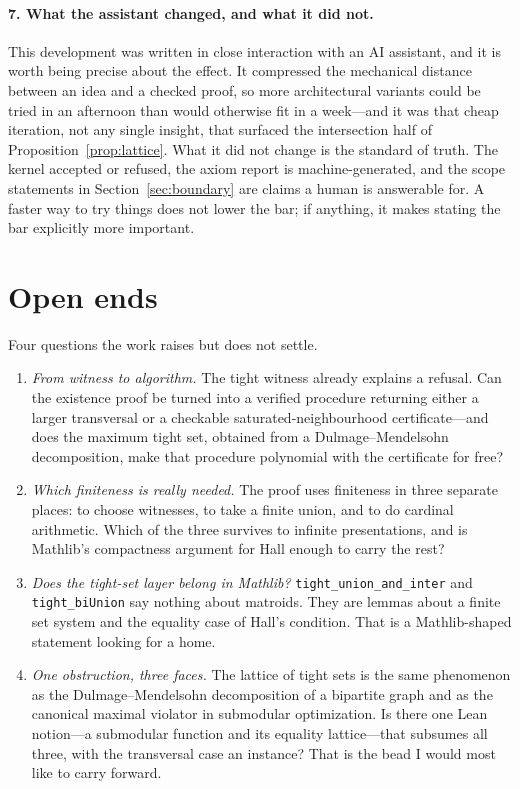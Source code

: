 \documentclass[11pt]{article}
\newcommand{\lean}[1]{\texttt{#1}}
\begin{document}
\paragraph{7. What the assistant changed, and what it did not.}
This development was written in close interaction with an AI assistant, and it is worth being
precise about the effect. It compressed the mechanical distance between an idea and a checked
proof, so more architectural variants could be tried in an afternoon than would otherwise fit in a
week---and it was that cheap iteration, not any single insight, that surfaced the intersection
half of Proposition~\ref{prop:lattice}. What it did not change is the standard of truth. The
kernel accepted or refused, the axiom report is machine-generated, and the scope statements in
Section~\ref{sec:boundary} are claims a human is answerable for. A faster way to try things does
not lower the bar; if anything, it makes stating the bar explicitly more important.

\section{Open ends}\label{sec:questions}

Four questions the work raises but does not settle.

\begin{enumerate}\itemsep3pt
\item \emph{From witness to algorithm.} The tight witness already explains a refusal. Can the
existence proof be turned into a verified procedure returning either a larger transversal or a
checkable saturated-neighbourhood certificate---and does the maximum tight set, obtained from a
Dulmage--Mendelsohn decomposition, make that procedure polynomial with the certificate for free?
\item \emph{Which finiteness is really needed.} The proof uses finiteness in three separate
places: to choose witnesses, to take a finite union, and to do cardinal arithmetic. Which of the
three survives to infinite presentations, and is Mathlib's compactness argument for Hall enough to
carry the rest?
\item \emph{Does the tight-set layer belong in Mathlib?} \lean{tight\_union\_and\_inter} and
\lean{tight\_biUnion} say nothing about matroids. They are lemmas about a finite set system and
the equality case of Hall's condition. That is a Mathlib-shaped statement looking for a home.
\item \emph{One obstruction, three faces.} The lattice of tight sets is the same phenomenon as the
Dulmage--Mendelsohn decomposition of a bipartite graph and as the canonical maximal violator in
submodular optimization. Is there one Lean notion---a submodular function and its equality
lattice---that subsumes all three, with the transversal case an instance? That is the bead I would
most like to carry forward.
\end{enumerate}
\end{document}
